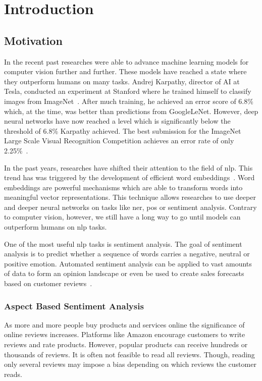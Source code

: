 \chapter{Introduction}
\label{chap:introduction}

\section{Motivation}
\label{sec:introduction_motivation}

In the recent past researches were able to advance machine learning models for computer vision further and further. These models have reached a state where they outperform humans on many tasks. Andrej Karpathy, director of AI at Tesla, conducted an experiment at Stanford where he trained himself to classify images from ImageNet~\cite{Karpathy2014}. After much training, he achieved an error score of 6.8\% which, at the time, was better than predictions from GoogleLeNet. However, deep neural networks have now reached a level which is significantly below the threshold of 6.8\% Karpathy achieved. The best submission for the ImageNet Large Scale Visual Recognition Competition achieves an error rate of only 2.25\%~\cite{Hu2018}.
\bigskip

In the past years, researches have shifted their attention to the field of \acrfull{nlp}. This trend has was triggered by the development of efficient word embeddings~\cite{Mikolov2013c}. Word embeddings are powerful mechanisms which are able to transform words into meaningful vector representations. This technique allows researches to use deeper and deeper neural networks on tasks like \gls{ner}, \gls{pos} or sentiment analysis. Contrary to computer vision, however, we still have a long way to go until models can outperform humans on \gls{nlp} tasks.
\bigskip

One of the most useful \gls{nlp} tasks is sentiment analysis. The goal of sentiment analysis is to predict whether a sequence of words carries a negative, neutral or positive emotion. Automated sentiment analysis can be applied to vast amounts of data to form an opinion landscape or even be used to create sales forecasts based on customer reviews~\cite{Shen2015}. 
\medskip

\subsection*{Aspect Based Sentiment Analysis}

As more and more people buy products and services online the significance of online reviews increases. Platforms like Amazon encourage customers to write reviews and rate products. However, popular products can receive hundreds or thousands of reviews. It is often not feasible to read all reviews. Though, reading only several reviews may impose a bias depending on which reviews the customer reads.
\medskip

